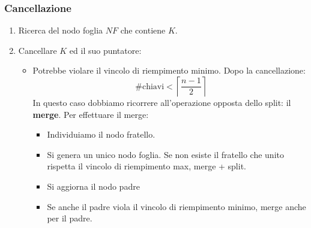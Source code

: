 \documentclass[a4paper]{article}
\begin{document}
\subsubsection{Cancellazione}

\begin{enumerate}
    \item Ricerca del nodo foglia $NF$ che contiene $K$.
    \item Cancellare $K$ ed il suo puntatore:
    \begin{itemize}
        \item Potrebbe violare il vincolo di riempimento minimo.
        Dopo la cancellazione:
        \[
            \text{ \#chiavi} < \left\lceil \frac{n-1}{2} \right\rceil
        \]
        In questo caso dobbiamo ricorrere all'operazione opposta dello split:
        il \textbf{merge}.
        Per effettuare il merge:
        \begin{itemize}
            \item Individuiamo il nodo fratello.
            \item Si genera un unico nodo foglia. Se non esiste il fratello che unito
            rispetta il vincolo di riempimento max, merge + split.
            \item Si aggiorna il nodo padre
            \item Se anche il padre viola il vincolo di riempimento minimo, merge anche per il padre.
        \end{itemize}
    \end{itemize}
\end{enumerate}
\end{document}
